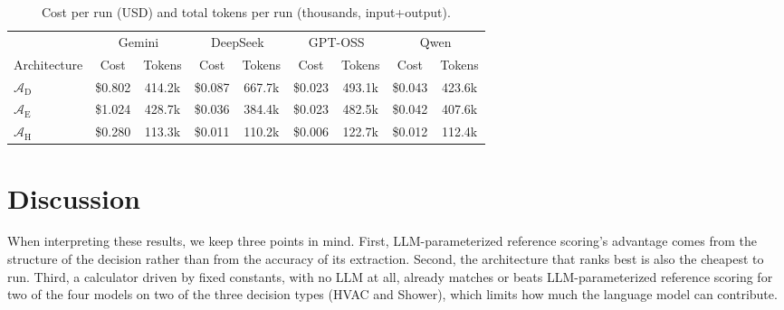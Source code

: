 \documentclass[final,3p,times]{elsarticle}
\begin{document}
\begin{table}[htbp]
\caption{Cost per run (USD) and total tokens per run (thousands, input+output).}
\label{tab:item8}
\centering
\begin{threeparttable}
\centering
\small
\renewcommand{\arraystretch}{1.15}
\setlength{\tabcolsep}{4pt}
\begin{tabular}{l cc cc cc cc}
\toprule
 & \multicolumn{2}{c}{Gemini} & \multicolumn{2}{c}{DeepSeek} & \multicolumn{2}{c}{GPT-OSS} & \multicolumn{2}{c}{Qwen} \\
\cmidrule(lr){2-3}\cmidrule(lr){4-5}\cmidrule(lr){6-7}\cmidrule(lr){8-9}
Architecture & Cost & Tokens & Cost & Tokens & Cost & Tokens & Cost & Tokens \\
\midrule
$\mathcal{A}_{\text{D}}$ & \$0.802 & 414.2k & \$0.087 & 667.7k & \$0.023 & 493.1k & \$0.043 & 423.6k \\
$\mathcal{A}_{\text{E}}$ & \$1.024 & 428.7k & \$0.036 & 384.4k & \$0.023 & 482.5k & \$0.042 & 407.6k \\
$\mathcal{A}_{\text{H}}$ & \$0.280 & 113.3k & \$0.011 & 110.2k & \$0.006 & 122.7k & \$0.012 & 112.4k \\
\bottomrule
\end{tabular}
\setlength{\tabcolsep}{6pt}
\renewcommand{\arraystretch}{1.0}
\end{threeparttable}
\end{table}

\FloatBarrier
\section{Discussion}
\label{sec:discussion}

When interpreting these results, we keep three points in mind. First, LLM-parameterized reference scoring's advantage comes from the structure of the decision rather than from the accuracy of its extraction. Second, the architecture that ranks best is also the cheapest to run. Third, a calculator driven by fixed constants, with no LLM at all, already matches or beats LLM-parameterized reference scoring for two of the four models on two of the three decision types (HVAC and Shower), which limits how much the language model can contribute.

\FloatBarrier
\end{document}
